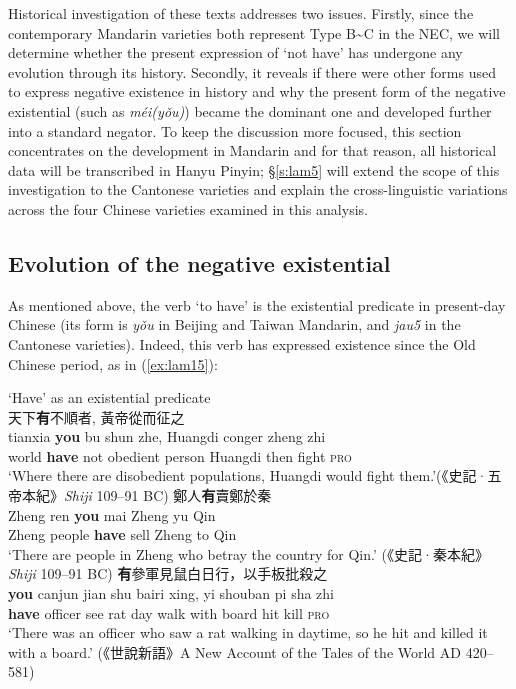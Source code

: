 \documentclass[output=paper]{langscibook}
\begin{document}
Historical investigation of these texts addresses two issues. Firstly, since the contemporary Mandarin varieties both represent Type B\sim C in the NEC, we will determine whether the present expression of `not have' has undergone any evolution through its history. Secondly, it reveals if there were other forms used to express negative existence in history and why the present form of the negative existential (such as \textit{méi(yǒu)}) became the dominant one and developed further into a standard negator. To keep the discussion more focused, this section concentrates on the development in Mandarin and for that reason, all historical data will be transcribed in Hanyu Pinyin; §\ref{s:lam5} will extend the scope of this investigation to the Cantonese varieties and explain the cross-linguistic variations across the four Chinese varieties examined in this analysis. 


\subsection{Evolution of the negative existential}\label{s:lam4-1}

As mentioned above, the verb `to have' is the existential predicate in present-day Chinese (its form is \textit{yǒu} in Beijing and Taiwan Mandarin, and \textit{jau5} in the Cantonese varieties). Indeed, this verb has expressed existence since the Old Chinese period, as in (\ref{ex:lam15}):

\ea `Have' as an existential predicate  \label{ex:lam15}\\
  \ea 天下\textbf{有}不順者, 黃帝從而征之 \label{ex:lam15a}\\
  	\gll tianxia \textbf{you} bu shun zhe, Huangdi conger zheng zhi\\
  	world \textbf{have} not obedient person Huangdi then fight \textsc{pro}\\
  	\glt `Where there are disobedient populations, Huangdi would fight them.'(《史記·五帝本紀》\emph{Shiji} 109–91 BC)  
  \ex 鄭人\textbf{有}賣鄭於秦 \label{ex:lam15b}\\
  	\gll Zheng ren \textbf{you}	mai	Zheng yu Qin\\
  	Zheng people \textbf{have} sell Zheng to Qin\\
  	\glt `There are people in Zheng who betray the country for Qin.' (《史記·秦本紀》\emph{Shiji} 109–91 BC)  
  \ex \textbf{有}參軍見鼠白日行，以手板批殺之 \label{ex:lam15c}\\
	\gll \textbf{you} canjun jian shu bairi xing, yi shouban pi sha zhi\\
	\textbf{have} officer see rat day walk with board hit kill \textsc{pro}\\
	\glt`There was an officer who saw a rat walking in daytime, so he hit and killed it with a board.' (《世說新語》A New Account of the Tales of the World AD 420–581)
\z \z 
\end{document}
